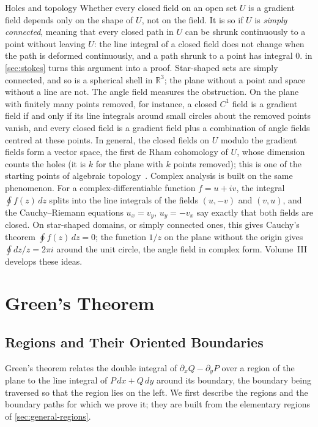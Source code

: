 \begin{note}{Holes and topology}
Whether every closed field on an open set $U$ is a gradient field depends only on the shape of $U$, not on the field. It is so if $U$ is \emph{simply connected}, meaning that every closed path in $U$ can be shrunk continuously to a point without leaving $U$: the line integral of a closed field does not change when the path is deformed continuously, and a path shrunk to a point has integral $0$.  in \cref{sec:stokes} turns this argument into a proof. Star-shaped sets are simply connected, and so is a spherical shell in $\mathbb R^3$; the plane without a point and space without a line are not. The angle field measures the obstruction. On the plane with finitely many points removed, for instance, a closed $C^1$ field is a gradient field if and only if its line integrals around small circles about the removed points vanish, and every closed field is a gradient field plus a combination of angle fields centred at these points. In general, the closed fields on $U$ modulo the gradient fields form a vector space, the first de Rham cohomology of $U$, whose dimension counts the holes (it is $k$ for the plane with $k$ points removed); this is one of the starting points of algebraic topology~\cite{munkres1991}. Complex analysis is built on the same phenomenon. For a complex-differentiable function $f=u+iv$, the integral $\oint f(z)\,dz$ splits into the line integrals of the fields $(u,-v)$ and $(v,u)$, and the Cauchy--Riemann equations $u_x=v_y$, $u_y=-v_x$ say exactly that both fields are closed. On star-shaped domains, or simply connected ones, this gives Cauchy's theorem $\oint f(z)\,dz=0$; the function $1/z$ on the plane without the origin gives $\oint dz/z=2\pi i$ around the unit circle, the angle field in complex form. Volume~III develops these ideas.
\end{note}

\section{Green's Theorem}
\label{sec:green}

\subsection{Regions and Their Oriented Boundaries}

Green's theorem relates the double integral of $\partial_xQ-\partial_yP$ over a region of the plane to the line integral of $P\,dx+Q\,dy$ around its boundary, the boundary being traversed so that the region lies on the left. We first describe the regions and the boundary paths for which we prove it; they are built from the elementary regions of \cref{sec:general-regions}.

